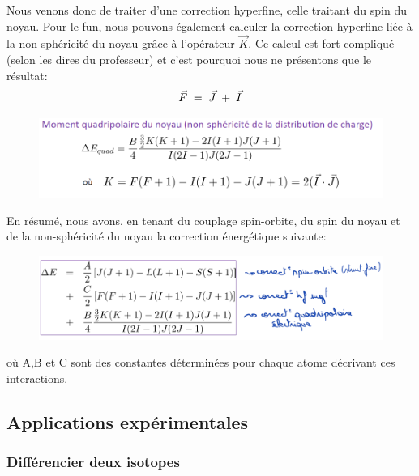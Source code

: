 \vspace{1cm}

Nous venons donc de traiter d'une correction hyperfine, celle traitant du spin du noyau. Pour le fun, nous pouvons également calculer la correction hyperfine liée à la non-sphéricité du noyau grâce à l'opérateur $\vec{K}$. Ce calcul est fort compliqué (selon les dires du professeur) et c'est pourquoi nous ne présentons que le résultat:
\begin{equation*}
    \vec{F} \; = \; \vec{J} \; + \; \vec{I}
\end{equation*}
\begin{figure}[tph]
    \centering
    \includegraphics[scale=0.80]{Images2/CorrecK.PNG}
    \label{eq:correcK}
\end{figure}
En résumé, nous avons, en tenant du couplage spin-orbite, du spin du noyau et de la non-sphéricité du noyau la correction énergétique suivante:
\begin{figure}[tph]
    \centering
    \includegraphics[scale=0.80]{Images2/résuméCorrec.PNG}
    \label{eq:résuméCorrec}
\end{figure}
où A,B et C sont des constantes déterminées pour chaque atome décrivant ces interactions.



\subsection{Applications expérimentales}
\subsubsection{Différencier deux isotopes}



